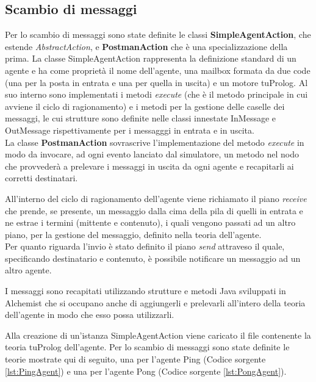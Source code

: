 \documentclass[12pt,a4paper,openright,twoside]{report}
\begin{document}
\subsection{Scambio di messaggi}\label{subsec:ScambioMessaggi}
Per lo scambio di messaggi sono state definite le classi \textbf{SimpleAgentAction}, che estende \textit{AbstractAction}, e \textbf{PostmanAction} che \`e una specializzazione della prima. La classe SimpleAgentAction rappresenta la definizione standard di un agente e ha come propriet\`a il nome dell'agente, una mailbox formata da due code (una per la posta in entrata e una per quella in uscita) e un motore tuProlog. Al suo interno sono implementati i metodi \textit{execute} (che \`e il metodo principale in cui avviene il ciclo di ragionamento) e i metodi per la gestione delle caselle dei messaggi, le cui strutture sono definite nelle classi innestate InMessage e OutMessage rispettivamente per i messagggi in entrata e in uscita.
\\
La classe \textbf{PostmanAction} sovrascrive l'implementazione del metodo \textit{execute} in modo da invocare, ad ogni evento lanciato dal simulatore, un metodo nel nodo che provveder\`a a prelevare i messaggi in uscita da ogni agente e recapitarli ai corretti destinatari.

\bigskip

All'interno del ciclo di ragionamento dell'agente viene richiamato il piano \textit{receive} che prende, se presente, un messaggio dalla cima della pila di quelli in entrata e ne estrae i termini (mittente e contenuto), i quali vengono passati ad un altro piano, per la gestione del messaggio, definito nella teoria dell'agente.
\\
Per quanto riguarda l'invio \`e stato definito il piano \textit{send} attraveso il quale, specificando destinatario e contenuto, \`e possibile notificare un messaggio ad un altro agente.

I messaggi sono recapitati utilizzando strutture e metodi Java sviluppati in Alchemist che si occupano anche di aggiungerli e prelevarli all'intero della teoria dell'agente in modo che esso possa utilizzarli.

\bigskip

Alla creazione di un'istanza SimpleAgentAction viene caricato il file contenente la teoria tuProlog dell'agente. Per lo scambio di messaggi sono state definite le teorie mostrate qui di seguito, una per l'agente Ping (Codice sorgente \ref{lst:PingAgent}) e una per l'agente Pong (Codice sorgente \ref{lst:PongAgent}).
\end{document}
